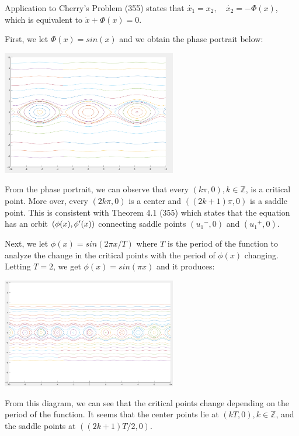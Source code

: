 \documentclass{article}
\begin{document}
\thispagestyle{firstpage}
\raggedright
Application to Cherry's Problem (355) states that  ${\dot{x_1}} = {x_2}, \quad {\dot{x_2}} = {-{\Phi}(x)}$,
which is equivalent to ${\ddot{x}} + {\Phi}(x) = 0$.

First, we let ${\Phi}(x) = sin(x)$ and we obtain the phase portrait below:
\linebreak

\centering
\includegraphics[width=3in]{sin_x.png}
\linebreak

\raggedright
From the phase portrait, we can observe that every $(k{\pi},0), k \in \mathbb{Z}$, is a critical point. More over, every $(2k{\pi}, 0)$ is a center and ${((2k+1)\pi, 0)}$ is a saddle point. This is consistent with Theorem 4.1 (355) which states that the equation has an orbit $(\phi(x), {\phi}\sp{\prime}(x))$ connecting saddle points $({u_1}^-, 0)$ and $({u_1}^+, 0)$.

\vspace{5mm}

Next, we let $\phi(x) = sin(2{\pi}x/T)$ where $T$ is the period of the function to analyze the change in the critical points with the period of $\phi(x)$ changing. Letting $T = 2$, we get $\phi(x) = sin({\pi}x)$ and it produces:
\linebreak

\centering
\includegraphics[width=3in]{sin_pi_x.png}
\linebreak

\raggedright
From this diagram, we can see that the critical points change depending on the period of the function. It seems that the center points lie at $(kT, 0), k \in \mathbb{Z}$, and the saddle points at $((2k+1){T/2}, 0)$. 
\end{document}
